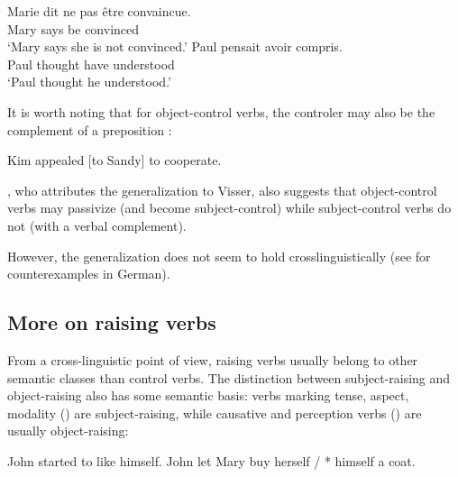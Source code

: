 \documentclass[output=paper
	        ,collection
	        ,collectionchapter
 	        ,biblatex
                ,babelshorthands
                ,newtxmath
                ,draftmode
                ,colorlinks, citecolor=brown
]{./langsci/langscibook}
\begin{document}
\begin{exe}
\ex \begin{xlist}
\ex \gll Marie dit {ne pas} \^etre convaincue. \\
Mary says  be convinced \\
\glt `Mary says she is not convinced.'	
\ex \gll Paul pensait  avoir compris. \\
Paul thought have understood \\
\glt `Paul thought he understood.'
 \end{xlist}
\end{exe}

It is worth noting that for object-control verbs, the controler may also be the complement of a preposition \citep[]{PollardandSag1994}:

\begin{exe}
\ex Kim appealed [to Sandy] to cooperate. \label{to}
\end{exe}


 
 \citet{Bresnan1982}, who attributes the generalization to Visser, also suggests that object-control verbs may passivize (and become subject-control) while subject-control verbs do not (with a verbal complement).
 
\eal
{}\label{persuade-pass}
\label{promise-pass}
\zl
However, the generalization does not seem to hold crosslinguistically (see  for counterexamples in German).
 
\subsection{More on raising verbs}

From a cross-linguistic point of view, raising verbs usually belong to other semantic classes than control verbs. The distinction between subject-raising and object-raising also has some semantic basis: verbs marking tense, aspect, modality () are subject-raising, while
causative and perception verbs () are usually object-raising:

	\begin{exe}
\ex  \begin{xlist}
\ex John started to like himself.
\ex John let Mary buy herself / * himself a coat.
	 \end{xlist}
	 \end{exe}
	
\end{document}
